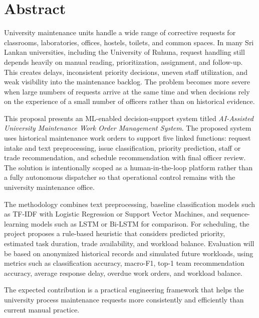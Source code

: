 \documentclass[11pt,a4paper]{report}
\begin{document}
\hypersetup{pageanchor=false}

\clearpage
\hypersetup{pageanchor=true}


\chapter*{Abstract}
University maintenance units handle a wide range of corrective requests for classrooms, laboratories, offices, hostels, toilets, and common spaces. In many Sri Lankan universities, including the University of Ruhuna, request handling still depends heavily on manual reading, prioritization, assignment, and follow-up. This creates delays, inconsistent priority decisions, uneven staff utilization, and weak visibility into the maintenance backlog. The problem becomes more severe when large numbers of requests arrive at the same time and when decisions rely on the experience of a small number of officers rather than on historical evidence.

This proposal presents an \ac{ML}-enabled decision-support system titled \textit{AI-Assisted University Maintenance Work Order Management System}. The proposed system uses historical maintenance work orders to support five linked functions: request intake and text preprocessing, issue classification, priority prediction, staff or trade recommendation, and schedule recommendation with final officer review. The solution is intentionally scoped as a human-in-the-loop platform rather than a fully autonomous dispatcher so that operational control remains with the university maintenance office.

The methodology combines text preprocessing, baseline classification models such as TF-IDF with Logistic Regression or Support Vector Machines, and sequence-learning models such as \ac{LSTM} or Bi-LSTM for comparison. For scheduling, the project proposes a rule-based heuristic that considers predicted priority, estimated task duration, trade availability, and workload balance. Evaluation will be based on anonymized historical records and simulated future workloads, using metrics such as classification accuracy, macro-F1, top-1 team recommendation accuracy, average response delay, overdue work orders, and workload balance.

The expected contribution is a practical engineering framework that helps the university process maintenance requests more consistently and efficiently than current manual practice.
\newpage
\end{document}
